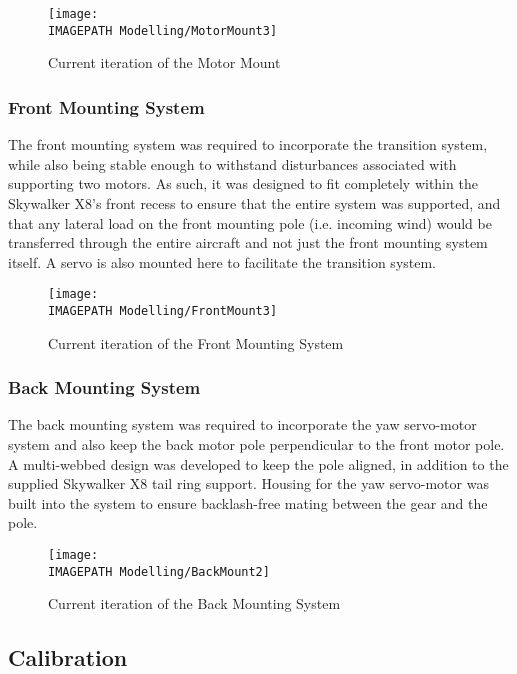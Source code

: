 \begin{figure}[!ht]
	\centering
	\texttt{[image: \\IMAGEPATH Modelling/MotorMount3]}
	\caption{Current iteration of the Motor Mount}
	\label{fig:designmotormount}
\end{figure}
	
\subsubsection*{Front Mounting System}
The front mounting system was required to incorporate the transition system, while also being stable enough to withstand disturbances associated with supporting two motors. As such, it was designed to fit completely within the Skywalker X8's front recess to ensure that the entire system was supported, and that any lateral load on the front mounting pole (i.e. incoming wind) would be transferred through the entire aircraft and not just the front mounting system itself. A servo is also mounted here to facilitate the transition system.

\begin{figure}[!ht]
	\centering
	\texttt{[image: \\IMAGEPATH Modelling/FrontMount3]}
	\caption{Current iteration of the Front Mounting System}
	\label{fig:designfrontmount}
\end{figure}
	
\subsubsection*{Back Mounting System}
The back mounting system was required to incorporate the yaw servo-motor system and also keep the back motor pole perpendicular to the front motor pole. A multi-webbed design was developed to keep the pole aligned, in addition to the supplied Skywalker X8 tail ring support. Housing for the yaw servo-motor was built into the system to ensure backlash-free mating between the gear and the pole.\\

\begin{figure}[!ht]
	\centering
	\texttt{[image: \\IMAGEPATH Modelling/BackMount2]}
	\caption{Current iteration of the Back Mounting System}
	\label{fig:designbackmount}
\end{figure}

\subsection{Calibration}
